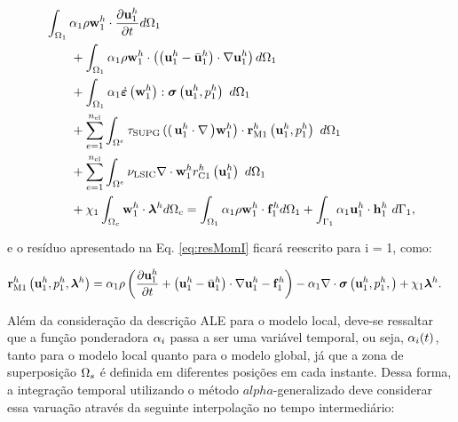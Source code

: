 \documentclass[tese_patricia]{subfiles}
\begin{document}
\begin{align}
	\begin{split}
		&\int_{\domain_1} \arlequinWFLocal \density \wlocalh \cdot \frac{\partial\ulocalh}{\partial t} d\domain_{1} \\ 
		&\qquad+
		\int_{\domain_1} \arlequinWFLocal \density \wlocalh \cdot  \left(\left(\ulocalh - \velocityALEh_{1}\right) \cdot \nabla\ulocalh\right) d\domain_{1}  \\ 
		&\qquad+	
		\int_{\domain_{1}} \arlequinWFLocal \strainratetensor \left(\wlocalh\right) : \stresstensor \left(\ulocalh,\plocalh\right)\ d\domain_{1} 
		\\ 
		&\qquad+ \sum_{e=1}^{\nel} \int_{\domainE} \SUPG  \left( \right(\ulocalh \cdot \nabla \left) \wlocalh\right) \cdot \resMomLocal\left(\ulocalh,\plocalh \right)\  d\domain_{1} \\ 
		&\qquad+\sum_{e=1}^{\nel} \int_{\domainE} \LSIC \nabla \cdot \wlocalh \resPreLocal
		\left(\ulocalh\right)\  d\domain_{1} \\
		&\qquad+  \chi_{1} \int_{\domain_c} \wlocalh \cdot \lagrangeMultiplier^{h} d\domain_{c}  = \int_{\domain_1} \arlequinWFLocal \density \wlocalh \cdot  \sbodyforce_{1}^{h} d\domain_{1} + \int_{\boundary_{1}} \arlequinWFLocal \ulocalh \cdot \straction_{1}^{h}\ d\boundary_{1},
		\label{eq:QtdeMovArlqALE}
	\end{split}
\end{align}

\noindent e o resíduo apresentado na Eq. \ref{eq:resMomI} ficará reescrito para i = 1, como:


\begin{align}
	\mathbf{r}_{\mathrm{M1}}^{h} \left(\mathbf{u}_1^h,p_1^h,\boldsymbol{\lambda}^h \right)&=\alpha_{1} \rho\left(\frac{\partial\mathbf{u}_1^h}{\partial t}+ \left(\mathbf{u}_1^h - \bar{\mathbf{u}}^h_{1}\right) \cdot \nabla\mathbf{u}_1^h  - \mathbf{f}_1^{h}\right) - \alpha_{1} \nabla \cdot \boldsymbol{\sigma}\left(\mathbf{u}_1^h,p_1^h,\right)+ \chi_{1} \boldsymbol{\lambda}^h \label{eq:resMomARLQALE}.
\end{align}

Além da consideração da descrição ALE para o modelo local, deve-se ressaltar que a função ponderadora $\alpha_{i}$ passa a ser uma variável temporal, ou seja, $\alpha_{i}(t)$, tanto para o modelo local quanto para o modelo global, já que a zona de superposição $\Omega_s$ é definida em diferentes posições em cada instante. Dessa forma, a integração temporal utilizando o método $alpha$-generalizado deve considerar essa varuação através da seguinte interpolação no tempo intermediário:
\end{document}
